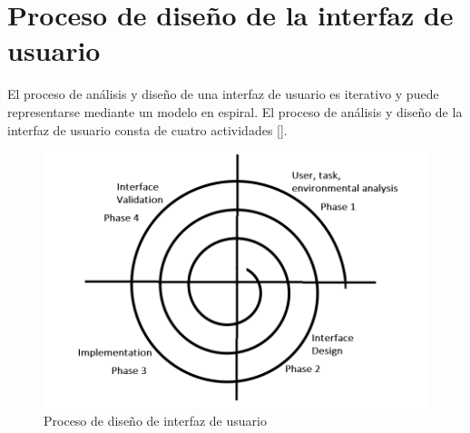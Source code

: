 \section{Proceso de diseño de la interfaz de usuario}
El proceso de análisis y diseño de una interfaz de usuario es iterativo y puede representarse mediante un modelo en espiral. El proceso de análisis y diseño de la interfaz de usuario consta de cuatro actividades [\cite{36,37}].

\begin{figure}[h]
\centering
\includegraphics[scale=0.3]{Graphics/espiral}
\caption{Proceso de diseño de interfaz de usuario}
\label{fig:espiral}
\end{figure}

